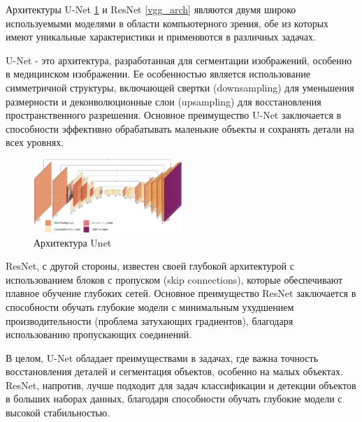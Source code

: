 Архитектуры U-Net \ref{unet_arch}  и ResNet \ref{vgg_arch} являются двумя широко используемыми моделями в области компьютерного зрения, обе из которых имеют уникальные характеристики и применяются в различных задачах.

U-Net - это архитектура, разработанная для сегментации изображений, особенно в медицинском изображении. Ее особенностью является использование симметричной структуры, включающей свертки (downsampling) для уменьшения размерности и деконволюционные слои (upsampling) для восстановления пространственного разрешения. Основное преимущество U-Net заключается в способности эффективно обрабатывать маленькие объекты и сохранять детали на всех уровнях.

\begin{figure}[h]
    \centering
    \includegraphics[width=0.5\textwidth]{assets/cv/unet.png}
    \caption{Архитектура Unet \cite{ronneberger2015u}}
    \label{unet_arch}
\end{figure}


ResNet, с другой стороны, известен своей глубокой архитектурой с использованием блоков с пропуском (skip connections), которые обеспечивают плавное обучение глубоких сетей. Основное преимущество ResNet заключается в способности обучать глубокие модели с минимальным ухудшением производительности (проблема затухающих градиентов), благодаря использованию пропускающих соединений.

В целом, U-Net обладает преимуществами в задачах, где важна точность восстановления деталей и сегментация объектов, особенно на малых объектах. ResNet, напротив, лучше подходит для задач классификации и детекции объектов в больших наборах данных, благодаря способности обучать глубокие модели с высокой стабильностью.


